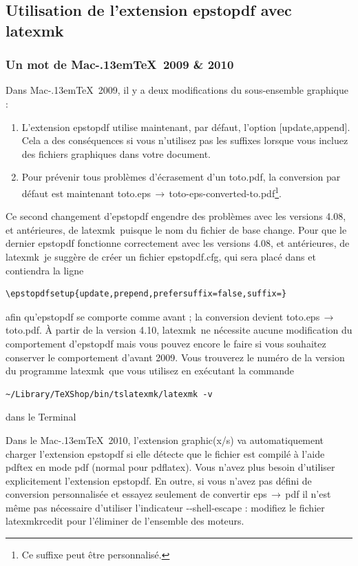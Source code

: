 \documentclass[11pt,french]{article}
\newcommand{\MacTeX}{Mac\kern-.13em\TeX}
\newcommand{\latexmk}{\textsf{latexmk}}
\newcommand{\cmd}[1]{\textsf{#1}}
\newcommand{\To}{\,\(\to\)\,}
\begin{document}
\subsection{Utilisation de l'extension \cmd{epstopdf} avec \latexmk}

\subsubsection{Un mot de \MacTeX\ 2009 \& 2010}

Dans \MacTeX\ 2009, il y a deux modifications du sous-ensemble graphique :
\begin{enumerate}
\item 
L'extension \cmd{epstopdf} utilise maintenant, par défaut, l'option \cmd{[update,append]}. Cela a des conséquences si vous n'utilisez pas les suffixes lorsque vous incluez des fichiers graphiques dans votre document.
\item 
Pour prévenir tous problèmes d'écrasement d'un \cmd{toto.pdf}, la conversion par défaut est maintenant \cmd{toto.eps}\To\cmd{toto-eps-converted-to.pdf}\footnote{Ce suffixe peut être personnalisé.}.
\end{enumerate}

Ce second changement d'\cmd{epstopdf} engendre des problèmes avec les versions 4.08, et antérieures, de \latexmk\ puisque le nom du fichier de base change. Pour que le dernier \cmd{epstopdf} fonctionne correctement avec les versions 4.08, et antérieures, de \latexmk\ je suggère de créer un fichier \cmd{epstopdf.cfg}, qui sera placé dans  et contiendra la ligne

\begin{verbatim}
\epstopdfsetup{update,prepend,prefersuffix=false,suffix=}
\end{verbatim}
afin qu'\cmd{epstopdf} se comporte comme avant ; la conversion devient \cmd{toto.eps}\To\cmd{toto.pdf}. À partir de la version 4.10, \latexmk\ ne nécessite aucune modification du comportement d'\cmd{epstopdf} mais vous pouvez encore le faire si vous souhaitez conserver le comportement d'avant 2009. Vous trouverez le numéro de la version du programme \latexmk\ que vous utilisez en exécutant la commande

\begin{verbatim}
~/Library/TeXShop/bin/tslatexmk/latexmk -v
\end{verbatim}
dans le \cmd{Terminal}

Dans le \MacTeX\ 2010, l'extension \cmd{graphic(x/s)} va automatiquement charger l'extension \cmd{epstopdf} si elle détecte que le fichier est compilé à l'aide \cmd{pdftex} en mode \cmd{pdf} (normal pour \cmd{pdflatex}). Vous n'avez plus besoin d'utiliser explicitement l'extension \cmd{epstopdf}. En outre, si vous n'avez pas défini de conversion personnalisée et essayez seulement de convertir \cmd{eps}\To\cmd{pdf} il n'est même pas nécessaire d'utiliser l'indicateur \cmd{-{}-shell-escape} : modifiez le fichier \cmd{latexmkrcedit} pour l'éliminer de l'ensemble des moteurs.
\end{document}
